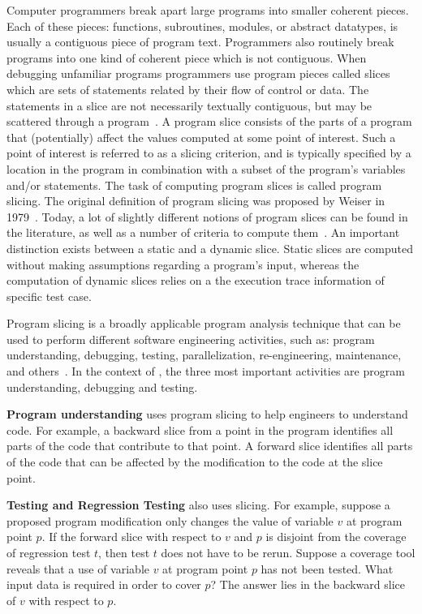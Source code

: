 Computer programmers break apart large programs into smaller
coherent pieces. Each of these pieces: functions, subroutines,
modules, or abstract datatypes, is usually a contiguous piece of
program text. Programmers also routinely break programs into one
kind of coherent piece which is not contiguous. When debugging
unfamiliar programs programmers use program pieces called slices
which are sets of statements related by their flow of control or
data. The statements in a slice are not necessarily textually
contiguous, but may be scattered through a
program~\cite{Weiser82PUSW}. A program slice consists of the parts
of a program that (potentially) affect the values computed at some
point of interest. Such a point of interest is referred to as a
slicing criterion, and is typically specified by a location in the
program in combination with a subset of the program's variables
and/or statements. The task of computing program slices is called
program slicing. The original definition of program slicing was
proposed by Weiser in 1979~\cite{Weiser79PSFP,Weiser84PSLI}.
Today, a lot of slightly different notions of program slices can
be found in the literature, as well as a number of criteria to
compute them~\cite{Tip95SPST}. An important distinction exists
between a static and a dynamic slice. Static slices are computed
without making assumptions regarding a program's input, whereas
the computation of dynamic slices relies on a the execution trace
information of specific test case.

Program slicing is a broadly applicable program analysis technique
that can be used to perform different software engineering
activities, such as: program understanding, debugging, testing,
parallelization, re-engineering, maintenance, and
others~\cite{Gammatech00DGPS}. In the context of \toolname, the
three most important activities are program understanding,
debugging and testing.

\textbf{Program understanding} uses program slicing to help
engineers to understand code. For example, a backward slice from a
point in the program identifies all parts of the code that
contribute to that point. A forward slice identifies all parts of
the code that can be affected by the modification to the code at
the slice point.

\textbf{Testing and Regression Testing} also uses slicing. For
example, suppose a proposed program modification only changes the
value of variable $v$ at program point $p$. If the forward slice
with respect to $v$ and $p$ is disjoint from the coverage of
regression test $t$, then test $t$ does not have to be rerun.
Suppose a coverage tool reveals that a use of variable $v$ at
program point $p$ has not been tested. What input data is required
in order to cover $p$? The answer lies in the backward slice of
$v$ with respect to $p$.

